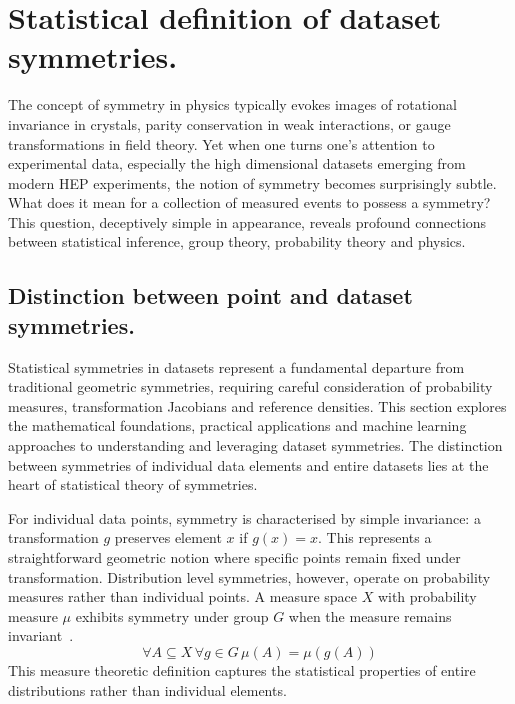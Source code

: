 \section{Statistical definition of dataset symmetries.}
    \label{sec:statistical-def-of-symmetries}
    The concept of symmetry in physics typically evokes images of rotational invariance in crystals, parity conservation in weak interactions, or gauge transformations in field theory.
    Yet when one turns one's attention to experimental data, especially the high dimensional datasets emerging from modern HEP experiments, the notion of symmetry becomes surprisingly subtle.
    What does it mean for a collection of measured events to possess a symmetry?
    This question, deceptively simple in appearance, reveals profound connections between statistical inference, group theory, probability theory and physics.
    
    \subsection{Distinction between point and dataset symmetries.}
        Statistical symmetries in datasets represent a fundamental departure from traditional geometric symmetries, requiring careful consideration of probability measures, transformation Jacobians and reference densities.
        This section explores the mathematical foundations, practical applications and machine learning approaches to understanding and leveraging dataset symmetries.
        The distinction between symmetries of individual data elements and entire datasets lies at the heart of statistical theory of symmetries.
        
        For individual data points, symmetry is characterised by simple invariance: a transformation \(g\) preserves element \(x\) if \(g(x) = x\).
        This represents a straightforward geometric notion where specific points remain fixed under transformation.
        Distribution level symmetries, however, operate on probability measures rather than individual points.
        A measure space \(X\) with probability measure \(\mu\) exhibits symmetry under group \(G\) when the measure remains invariant~\cite{hudson_symmetry_1986}.
        \[
            \forall A\subseteq X \, \forall g\in G\, \mu(A) = \mu(g(A))
        \]
        This measure theoretic definition captures the statistical properties of entire distributions rather than individual elements.
        
